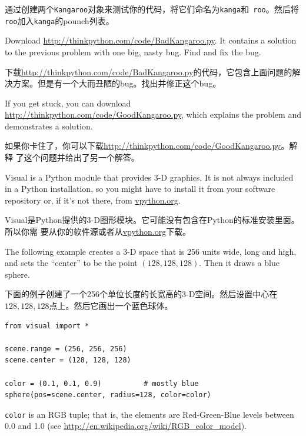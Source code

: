 \documentclass[10pt]{book}
\begin{document}
\begin{CJK}{UTF8}{gbsn}
\begin{exercise}
通过创建两个{\tt Kangaroo}对象来测试你的代码，将它们命名为{\tt kanga}和{\tt
roo}。然后将{\tt roo}加入{\tt kanga}的pounch列表。

Download \url{http://thinkpython.com/code/BadKangaroo.py}.  It contains
a solution to the previous problem with one big, nasty bug.
Find and fix the bug.

下载\url{http://thinkpython.com/code/BadKangaroo.py}的代码，它包含上面问题的解
决方案。但是有一个大而丑陋的bug。找出并修正这个bug。

If you get stuck, you can download
\url{http://thinkpython.com/code/GoodKangaroo.py}, which explains the
problem and demonstrates a solution.

如果你卡住了，你可以下载\url{http://thinkpython.com/code/GoodKangaroo.py}。解释
了这个问题并给出了另一个解答。

\end{exercise}




\begin{exercise}

Visual is a Python module that provides 3-D graphics.  It is
not always included in a Python installation, so you might have
to install it from your software repository or, if it's not there,
from \url{vpython.org}.

Visual是Python提供的3-D图形模块。它可能没有包含在Python的标准安装里面。所以你需
要从你的软件源或者从\url{vpython.org}下载。

The following example creates a 3-D space that is 256 units
wide, long and high, and sets the ``center'' to be the
point $(128,128,128)$.  Then it draws a blue sphere.

下面的例子创建了一个256个单位长度的长宽高的3-D空间。然后设置中心在
${128,128,128}$点上。然后它画出一个蓝色球体。

\begin{verbatim}
from visual import *

scene.range = (256, 256, 256)
scene.center = (128, 128, 128)

color = (0.1, 0.1, 0.9)          # mostly blue
sphere(pos=scene.center, radius=128, color=color)
\end{verbatim}

{\tt color} is an RGB tuple; that is, the elements are Red-Green-Blue
levels between 0.0 and 1.0 (see
\url{http://en.wikipedia.org/wiki/RGB_color_model}).


\end{exercise}
\end{CJK}
\end{document}
